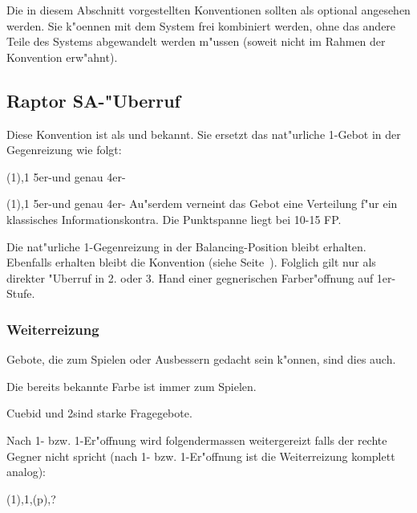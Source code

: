 \begin{appendix}
Die in diesem Abschnitt vorgestellten Konventionen sollten als optional angesehen
werden.  Sie k"oennen mit dem System frei kombiniert werden, ohne das andere
Teile des Systems abgewandelt werden m"ussen (soweit nicht im Rahmen der Konvention
erw"ahnt).

\subsection{Raptor SA-"Uberruf}

Diese Konvention ist als  und  bekannt.
Sie ersetzt das nat"urliche 1\SA-Gebot in der Gegenreizung wie folgt:

\bdsc
	\item[(1\uf)\sep{}1\SA] 5\pl{}er-\aufa und genau 4er-\ofa
	\item[(1\of)\sep{}1\SA] 5\pl{}er-\ufa und genau 4er-\aofa
\edsc
Au"serdem verneint das Gebot eine Verteilung f"ur ein klassisches Informationskontra.
Die Punktspanne liegt bei 10-15 FP.

Die nat"urliche 1\SA-Gegenreizung in der Balancing-Position bleibt erhalten.
Ebenfalls erhalten bleibt die Konvention 
(siehe Seite~\pageref{sandwichnt}).  Folglich gilt  nur als direkter
"Uberruf in 2. oder 3. Hand einer gegnerischen Farber"offnung auf 1er-Stufe.

\subsubsection{Weiterreizung}

\begin{compactitem}
\item Gebote, die zum Spielen oder Ausbessern gedacht sein k"onnen, sind dies auch.
\item Die bereits bekannte Farbe ist immer zum Spielen.
\item Cuebid und 2\SA sind starke Fragegebote.
\end{compactitem}

Nach 1\tre{}- bzw. 1\coe{}-Er"offnung wird folgendermassen weitergereizt falls der
rechte Gegner nicht spricht (nach 1\kar{}- bzw. 1\pik{}-Er"offnung ist die Weiterreizung
komplett analog):
\bdsc
	\item[(1\tre)\sep{}1\SA{}\sep{}(p)\sep{}?]~
		

\end{appendix}
